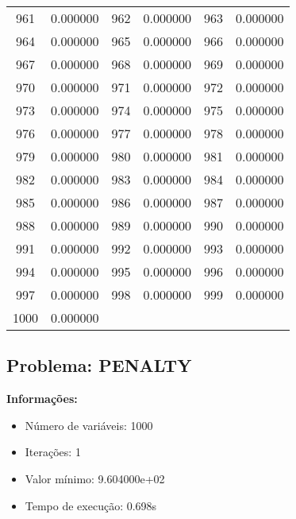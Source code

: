 \documentclass[12pt]{article}
\begin{document}
\begin{longtable}{@{}cc|cc|cc@{}}
961 & 0.000000 & 962 & 0.000000 & 963 & 0.000000 \\
964 & 0.000000 & 965 & 0.000000 & 966 & 0.000000 \\
967 & 0.000000 & 968 & 0.000000 & 969 & 0.000000 \\
970 & 0.000000 & 971 & 0.000000 & 972 & 0.000000 \\
973 & 0.000000 & 974 & 0.000000 & 975 & 0.000000 \\
976 & 0.000000 & 977 & 0.000000 & 978 & 0.000000 \\
979 & 0.000000 & 980 & 0.000000 & 981 & 0.000000 \\
982 & 0.000000 & 983 & 0.000000 & 984 & 0.000000 \\
985 & 0.000000 & 986 & 0.000000 & 987 & 0.000000 \\
988 & 0.000000 & 989 & 0.000000 & 990 & 0.000000 \\
991 & 0.000000 & 992 & 0.000000 & 993 & 0.000000 \\
994 & 0.000000 & 995 & 0.000000 & 996 & 0.000000 \\
997 & 0.000000 & 998 & 0.000000 & 999 & 0.000000 \\
1000 & 0.000000 &  &  &  &  \\

\end{longtable}


\newpage            
\subsection{Problema: PENALTY}

\textbf{Informações:}
\begin{itemize}
\item Número de variáveis: 1000
\item Iterações: 1
\item Valor mínimo: 9.604000e+02
\item Tempo de execução: 0.698s
\end{itemize}
\end{document}
